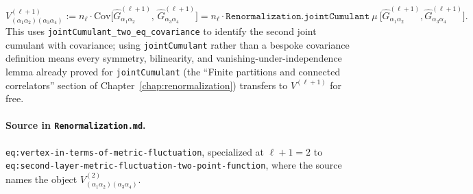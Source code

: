 \begin{definition}
\label{def:ngp:fourPointVertex}
\[
  V^{(\ell+1)}_{(\alpha_1\alpha_2)(\alpha_3\alpha_4)}
  := n_\ell\cdot\mathrm{Cov}\big[\widehat G^{(\ell+1)}_{\alpha_1\alpha_2},\,
     \widehat G^{(\ell+1)}_{\alpha_3\alpha_4}\big]
  = n_\ell\cdot\texttt{Renormalization.jointCumulant}\ \mu\
     \big[\widehat G^{(\ell+1)}_{\alpha_1\alpha_2},\widehat G^{(\ell+1)}_{\alpha_3\alpha_4}\big].
\]
This uses \texttt{jointCumulant\_two\_eq\_covariance} to identify the second joint cumulant with
covariance; using \texttt{jointCumulant} rather than a bespoke covariance definition means every
symmetry, bilinearity, and vanishing-under-independence lemma already proved for
\texttt{jointCumulant} (the ``Finite partitions and connected correlators'' section of
Chapter~\ref{chap:renormalization}) transfers to $V^{(\ell+1)}$ for free.

\paragraph{Source in \texttt{Renormalization.md}.}
\texttt{eq:vertex-in-terms-of-metric-fluctuation}, specialized at $\ell+1=2$ to
\texttt{eq:second-layer-metric-fluctuation-two-point-function}, where the source names the object
$V^{(2)}_{(\alpha_1\alpha_2)(\alpha_3\alpha_4)}$.
\end{definition}

